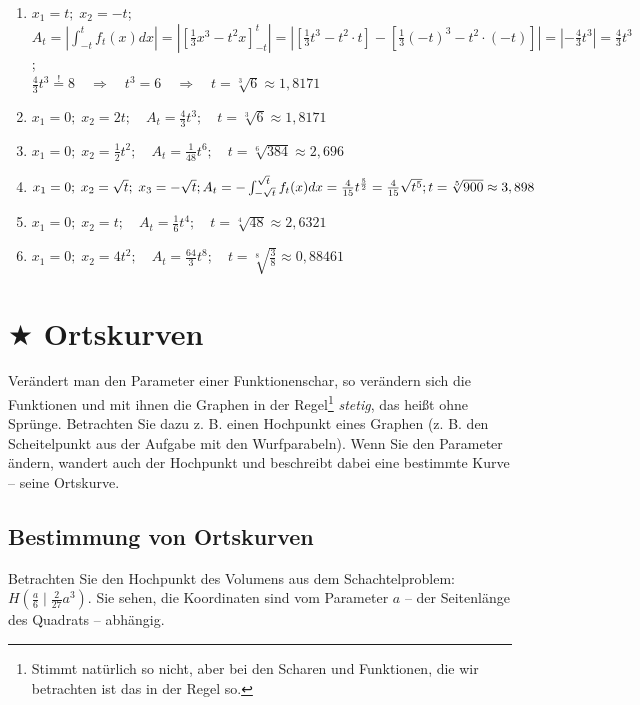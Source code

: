\documentclass[11pt,a4paper,twoside,fleqn]{article}
\begin{document}
  \begin{solution} \begin{multicols}{2}
    \begin{enumerate}
    \item $x_1=t;\;x_2=-t$;\\
      $A_t=|\int_{-t}^tf_t(x)dx|=
      |[\frac 1 3 x^3 - t^2x]_{-t}^t|=
      |[\frac 1 3 t^3 - t^2\cdot t] - [\frac 1 3 (-t)^3 - t^2\cdot (-t)]|
      =|-\frac 4 3 t^3|=\frac 4 3 t^3$;\\
      $\frac 4 3 t^3\overset{!}{=}8 \quad\Rightarrow\quad
      t^3= 6 \quad\Rightarrow\quad
      t=\sqrt[3]{6}\approx 1,8171$
    \item $x_1=0;\; x_2=2t;\quad A_t=\frac {4} 3 t^3;\quad
      t=\sqrt[3]{6}\approx 1,8171$
    \item $x_1=0;\; x_2=\frac 1 2 t^2; \quad A_t=\frac 1 {48} t^6; \quad
      t=\sqrt[6]{384}\approx 2,696$
    \item $x_1=0;\; x_2=\sqrt{t};\; x_3=-\sqrt{t};\\
      A_t=-\int_{-\sqrt{t}}^{\sqrt{t}}f_t(x)dx=
      \frac 4 {15}t^{\frac 5 2}=\frac 4 {15}\sqrt{t^5};\\
      t=\sqrt[5]{900}\approx 3,898$
    \item $x_1=0;\;x_2=t;\quad
      A_t=\frac 1 6 t^4;\quad
      t=\sqrt[4]{48}\approx 2,6321$
    \item $x_1=0;\;x_2=4t^2;\quad
      A_t=\frac{64} 3 t^8;\quad
      t=\sqrt[8]{\frac 3 8}\approx 0,88461$
    \end{enumerate}
  \end{multicols}
\end{solution}
\section{$\bigstar$ Ortskurven}
Verändert man den Parameter einer Funktionenschar, so verändern sich
die Funktionen und mit ihnen die Graphen in der Regel\footnote{Stimmt
  natürlich so nicht, aber bei den Scharen und Funktionen, die wir
  betrachten ist das in der Regel so.}  \emph{stetig}, das
heißt ohne Sprünge. Betrachten Sie dazu z. B. einen Hochpunkt eines
Graphen (z. B. den Scheitelpunkt aus der Aufgabe mit den
Wurfparabeln). Wenn Sie den Parameter ändern, wandert auch der
Hochpunkt und beschreibt dabei eine bestimmte Kurve -- seine
Ortskurve.
\subsection{Bestimmung von Ortskurven}
Betrachten Sie den Hochpunkt des Volumens aus dem Schachtelproblem:
$H\left(\frac a 6\mid\frac 2 {27}a^3\right)$. %
Sie sehen, die Koordinaten sind vom Parameter $a$ -- der Seitenlänge
des Quadrats -- abhängig.
\end{document}
